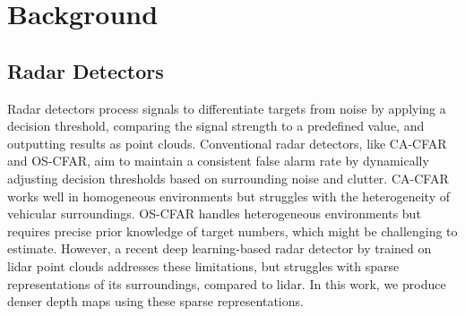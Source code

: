 \section{Background}
\subsection{Radar Detectors}


Radar detectors process signals to differentiate targets from noise by applying a decision threshold, comparing the signal strength to a predefined value, and outputting results as point clouds. Conventional radar detectors, like CA-CFAR and OS-CFAR, aim to maintain a consistent false alarm rate by dynamically adjusting decision thresholds based on surrounding noise and clutter. CA-CFAR works well in homogeneous environments but struggles with the heterogeneity of vehicular surroundings. OS-CFAR handles heterogeneous environments but requires precise prior knowledge of target numbers, which might be challenging to estimate. However, a recent deep learning-based radar detector by \cite{roldan2024see} trained on lidar point clouds addresses these limitations, but struggles with sparse representations of its surroundings, compared to lidar. In this work, we produce denser depth maps using these sparse representations.

